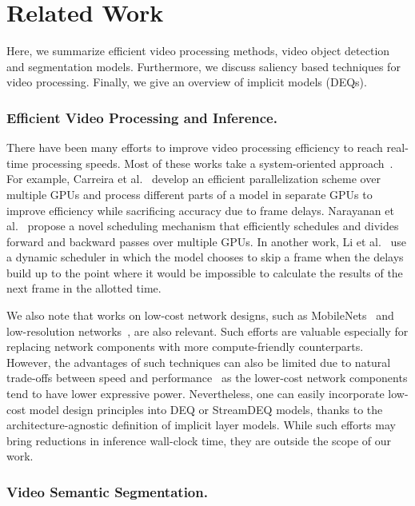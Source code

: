 \documentclass[runningheads]{llncs}
\begin{document}
\section{Related Work}\label{sec:related_work}


Here, we summarize efficient video processing methods, video object detection and segmentation models. Furthermore, we discuss saliency based techniques for video processing. Finally, we give an overview of implicit models (DEQs).


\subsubsection{Efficient Video Processing and Inference.}


There have been many efforts to improve video processing efficiency to reach real-time processing speeds. Most of these works take a system-oriented approach~\cite{carreira2018massively,narayanan2019pipedream,li2020towards}. For example, Carreira et al.~\cite{carreira2018massively} develop an efficient parallelization scheme over multiple GPUs and process different parts of a model in separate GPUs to improve efficiency while sacrificing accuracy due to frame delays. Narayanan et al.~\cite{narayanan2019pipedream} propose a novel scheduling mechanism that efficiently schedules and divides forward and backward passes over multiple GPUs. In another work, Li et al.~\cite{li2020towards} use a dynamic scheduler in which the model chooses to skip a frame when the delays build up to the point where it would be impossible to calculate the results of the next frame in the allotted time.


We also note that works on low-cost network designs, such as MobileNets~\cite{howard2017mobilenets,sandler2018mobilenetv2} and low-resolution networks~\cite{liu2018mobile,zhao2018deep}, are also relevant. Such efforts are valuable especially for replacing network components with more compute-friendly counterparts. However, the advantages of such techniques can also be limited due to natural trade-offs between speed and performance~\cite{zhu2020review} as the lower-cost network components tend to have lower expressive power. Nevertheless, one can easily incorporate low-cost model design principles into DEQ or StreamDEQ models, thanks to the architecture-agnostic definition of implicit layer models. While such efforts may bring reductions in inference wall-clock time, they are outside the scope of our work.


\subsubsection{Video Semantic Segmentation.}
\end{document}

